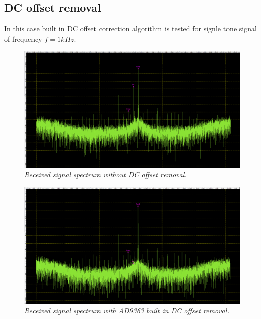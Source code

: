 \documentclass[en,printmode]{mgr}
\begin{document}
		\subsection*{DC offset removal}
	 	In this case built in DC offset correction algorithm is tested for signle tone
		signal of frequency $f=1kHz$.				
   		 	\begin{figure}[!htb]
    			\centering
   				\includegraphics[width=\textwidth]{plots/real_dcoff.png}
   		 		\caption{\textit{Received signal spectrum without DC offset removal.}}
   		 	\end{figure}
   		 	\vspace{0.5cm}
   		 	\begin{figure}[!htb]
    			\centering
   				\includegraphics[width=\textwidth]{plots/real_dcon.png}
   		 		\caption{\textit{Received signal spectrum with AD9363 built in DC offset removal.}}
   		 	\end{figure}
   		\newpage
\end{document}
